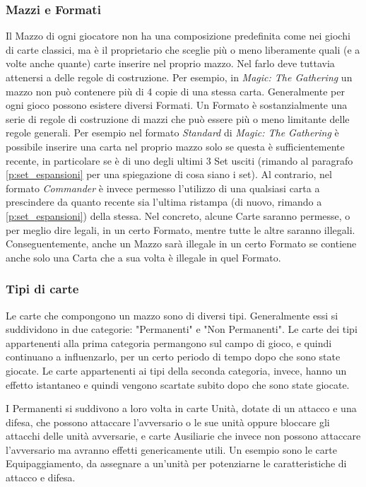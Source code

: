 \documentclass[12pt]{article}
\begin{document}
\subsubsection{Mazzi e Formati}
Il Mazzo di ogni giocatore non ha una composizione predefinita come nei giochi di carte classici, ma è il proprietario che sceglie più o meno liberamente quali (e a volte anche quante) carte inserire nel proprio mazzo. Nel farlo deve tuttavia attenersi a delle regole di costruzione. Per esempio, in \textit{Magic: The Gathering} un mazzo non può contenere più di 4 copie di una stessa carta. \newline
Generalmente per ogni gioco possono esistere diversi Formati. Un Formato è sostanzialmente una serie di regole di costruzione di mazzi che può essere più o meno limitante delle regole generali. Per esempio nel formato \textit{Standard} di \textit{Magic: The Gathering} è possibile inserire una carta nel proprio mazzo solo se questa è sufficientemente recente, in particolare se è di uno degli ultimi 3 Set usciti (rimando al paragrafo \ref{p:set_espansioni} per una spiegazione di cosa siano i set). Al contrario, nel formato \textit{Commander} è invece permesso l'utilizzo di una qualsiasi carta a prescindere da quanto recente sia l'ultima ristampa (di nuovo, rimando a \ref{p:set_espansioni})  della stessa. \newline
Nel concreto, alcune Carte saranno permesse, o per meglio dire legali, in un certo Formato, mentre tutte le altre saranno illegali. Conseguentemente, anche un Mazzo sarà illegale in un certo Formato se contiene anche solo una Carta che a sua volta è illegale in quel Formato.


\subsubsection{Tipi di carte}
Le carte che compongono un mazzo sono di diversi tipi. Generalmente essi si suddividono in due categorie: "Permanenti" e "Non Permanenti". Le carte dei tipi appartenenti alla prima categoria permangono sul campo di gioco, e quindi continuano a influenzarlo, per un certo periodo di tempo dopo che sono state giocate. Le carte appartenenti ai tipi della seconda categoria, invece, hanno un effetto istantaneo e quindi vengono scartate subito dopo che sono state giocate.

I Permanenti si suddivono a loro volta in carte Unità, dotate di un attacco e una difesa, che possono attaccare l’avversario o le sue unità oppure bloccare gli attacchi delle unità avversarie, e carte Ausiliarie che invece non possono attaccare l'avversario ma avranno effetti genericamente utili. Un esempio sono le carte Equipaggiamento, da assegnare a un'unità per potenziarne le caratteristiche di attacco e difesa. 
\end{document}
